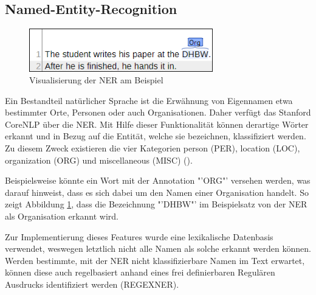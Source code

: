\subsection{Named-Entity-Recognition}
\label{subsec:ner}
\begin{figure}
\includegraphics[width=8cm]{pictures/NER.png}
\caption{Visualisierung der NER am Beispiel}
\label{fig:NER}
\end{figure}
Ein Bestandteil natürlicher Sprache ist die Erwähnung von Eigennamen etwa bestimmter Orte, Personen oder auch Organisationen. Daher verfügt das Stanford CoreNLP über die \ac{NER}. Mit Hilfe dieser Funktionalität können derartige Wörter erkannt und in Bezug auf die Entität, welche sie bezeichnen,  klassifiziert werden. Zu diesem Zweck existieren die vier Kategorien person (PER), location (LOC), organization (ORG) und miscellaneous (MISC) (\cite[vgl.][4]{STANFORDNER}).\par
Beispielsweise könnte ein Wort mit der Annotation "'ORG"' versehen werden, was darauf hinweist, dass es sich dabei um den Namen einer Organisation handelt. So zeigt Abbildung \ref{fig:NER}, dass die Bezeichnung "'DHBW"' im Beispielsatz von der \ac{NER} als Organisation erkannt wird.\par
Zur Implementierung dieses Features wurde eine lexikalische Datenbasis verwendet, weswegen letztlich nicht alle Namen als solche erkannt werden können. Werden bestimmte, mit der \ac{NER} nicht klassifizierbare Namen im Text erwartet, können diese auch regelbasiert anhand eines frei definierbaren Regulären Ausdrucks identifiziert werden (REGEXNER).


